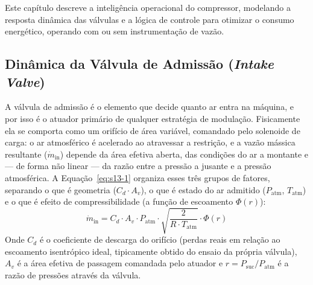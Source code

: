 \documentclass[12pt,a4paper]{article}
\numberwithin{equation}{section}
\numberwithin{table}{section}
\numberwithin{figure}{section}
\begin{document}
	
	Este capítulo descreve a inteligência operacional do compressor, modelando a resposta dinâmica das válvulas e a lógica de controle para otimizar o consumo energético, operando com ou sem instrumentação de vazão.
	
	\subsection{\textbf{Dinâmica da Válvula de Admissão (\textit{Intake Valve})}}
	A válvula de admissão é o elemento que decide quanto ar entra na máquina, e por isso é o atuador primário de qualquer estratégia de modulação. Fisicamente ela se comporta como um orifício de área variável, comandado pelo solenoide de carga: o ar atmosférico é acelerado ao atravessar a restrição, e a vazão mássica resultante ($\dot{m}_{\text{in}}$) depende da área efetiva aberta, das condições do ar a montante e — de forma não linear — da razão entre a pressão a jusante e a pressão atmosférica. A Equação~\eqref{eq:s13-1} organiza esses três grupos de fatores, separando o que é geometria ($C_d \cdot A_v$), o que é estado do ar admitido ($P_{\text{atm}}$, $T_{\text{atm}}$) e o que é efeito de compressibilidade (a função de escoamento $\Phi(r)$):
	\begin{equation}\label{eq:s13-1}
 \dot{m}_{\text{in}} = C_d \cdotp A_v \cdotp P_{\text{atm}} \cdotp \sqrt{\frac{2}{R \cdotp T_{\text{atm}}}} \cdotp \Phi(r)
\end{equation}
	Onde $C_d$ é o coeficiente de descarga do orifício (perdas reais em relação ao escoamento isentrópico ideal, tipicamente obtido do ensaio da própria válvula), $A_v$ é a área efetiva de passagem comandada pelo atuador e $r = P_{\text{suc}}/P_{\text{atm}}$ é a razão de pressões através da válvula.
\end{document}
